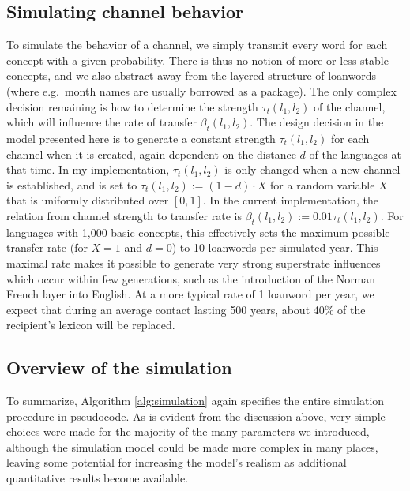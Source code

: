\subsection{Simulating channel behavior}
To simulate the behavior of a channel, we simply transmit every word for each concept with a given probability. There is thus no notion of more or less stable concepts, and we also abstract away from the layered structure of loanwords (where e.g.\ month names are usually borrowed as a package). The only complex decision remaining is how to determine the strength $\tau_t(l_1,l_2)$ of the channel, which will influence the rate of transfer $\beta_t(l_1,l_2)$. The design decision in the model presented here is to generate a constant strength $\tau_t(l_1,l_2)$ for each channel when it is created, again dependent on the distance $d$ of the languages at that time. In my implementation, $\tau_t(l_1,l_2)$ is only changed when a new channel is established, and is set to $\tau_t(l_1,l_2) := (1 - d) \cdot X$ for a random variable $X$ that is uniformly distributed over $[0,1]$. In the current implementation, the relation from channel strength to transfer rate is $\beta_t(l_1,l_2) := 0.01\tau_t(l_1,l_2)$. For languages with 1,000 basic concepts, this effectively sets the maximum possible transfer rate (for $X = 1$ and $d = 0$) to 10 loanwords per simulated year. This maximal rate makes it possible to generate very strong superstrate influences which occur within few generations, such as the introduction of the Norman French layer into English. At a more typical rate of 1 loanword per year, we expect that during an average contact lasting 500 years, about 40\% of the recipient's lexicon will be replaced.

\subsection{Overview of the simulation}
To summarize, Algorithm \ref{alg:simulation} again specifies the entire simulation procedure in pseudocode. As is evident from the discussion above, very simple choices were made for the majority of the many parameters we introduced, although the simulation model could be made more complex in many places, leaving some potential for increasing the model's realism as additional quantitative results become available.

